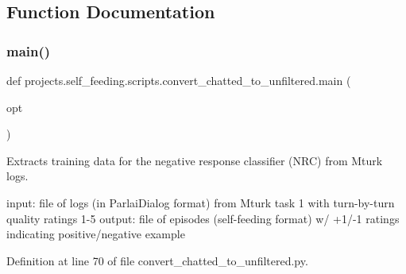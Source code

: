 \subsection{Function Documentation}
\mbox{\label{namespaceprojects_1_1self__feeding_1_1scripts_1_1convert__chatted__to__unfiltered_a1fc60d6ff016ace4fb6d348542ae6e86}} 
\subsubsection{\texorpdfstring{main()}{main()}}
{\footnotesize\ttfamily def projects.\+self\+\_\+feeding.\+scripts.\+convert\+\_\+chatted\+\_\+to\+\_\+unfiltered.\+main (\begin{DoxyParamCaption}\item[{}]{opt }\end{DoxyParamCaption})}

\begin{DoxyVerb}Extracts training data for the negative response classifier (NRC) from Mturk logs.

input: file of logs (in ParlaiDialog format) from Mturk task 1 with turn-by-turn
    quality ratings 1-5
output: file of episodes (self-feeding format) w/ +1/-1 ratings indicating
    positive/negative example
\end{DoxyVerb}
 

Definition at line 70 of file convert\+\_\+chatted\+\_\+to\+\_\+unfiltered.\+py.


